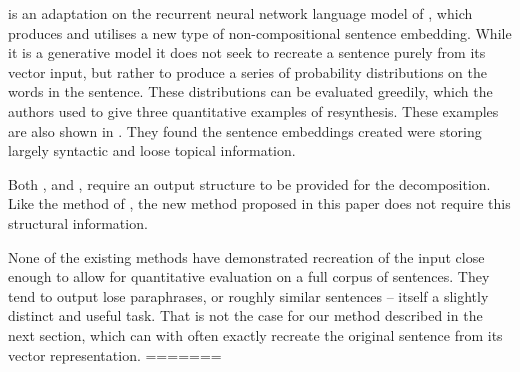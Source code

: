 \documentclass[11pt]{article}
\theoremstyle{plain}
\theoremstyle{definition}
\begin{document}
 
 


\textcite{Bowman2015SmoothGeneration} is an adaptation on the recurrent neural network language model of \textcite{mikolov2011RnnLM}, which produces and utilises a new type of non-compositional sentence embedding.  While it is a generative model it does not seek to recreate a sentence purely from its vector input, but rather to produce a series of probability distributions on the words in the sentence. These distributions can be evaluated greedily, which the authors used to give three quantitative examples of resynthesis. These examples are also shown in . They found the sentence embeddings created were storing largely syntactic and loose topical information. 


Both \textcite{Dinu2014CompositionalGeneration}, and  \textcite{iyyer2014generating}, require an output structure to be provided for the decomposition. Like the method of  \textcite{Bowman2015SmoothGeneration}, the new method proposed in this paper does not require this structural information.

None of the existing methods have demonstrated recreation of the input close enough to allow for quantitative evaluation on a full corpus of sentences. They tend to output lose paraphrases, or roughly similar sentences -- itself a slightly distinct and useful task.  That is not the case for our method described in the next section, which can with often exactly recreate the original sentence from its vector representation.
=======
\end{document}
